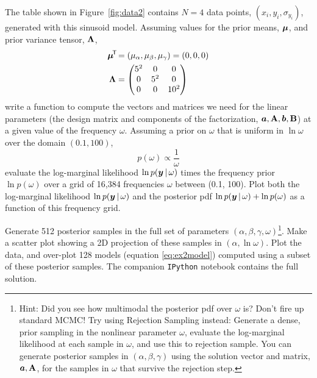 The table shown in Figure~\ref{fig:data2} contains $N=4$ data points, $(x_i,
y_i, \sigma_{y_i})$, generated with this sinusoid model.
Assuming values for the prior means, $\boldsymbol{\mu}$, and prior variance tensor,
$\mathbf{\Lambda}$,
\begin{align}
  \boldsymbol{\mu}^{\!\mathsf{T}\!} &= (\mu_\alpha, \mu_\beta, \mu_\gamma) = (0, 0, 0)\\
  \mathbf{\Lambda} &=
    \begin{pmatrix}
      5^2 & 0 & 0\\
      0 & 5^2 & 0\\
      0 & 0 & 10^2
    \end{pmatrix}
\end{align}
write a function to compute the vectors and matrices we need for the linear
parameters (the design matrix and components of the factorization, $\boldsymbol{a}, \mathbf{A},
\boldsymbol{b}, \mathbf{B}$) at a given value of the frequency $\omega$.
Assuming a prior on $\omega$ that is uniform in $\ln\omega$ over the domain
$(0.1, 100)$,
\begin{equation}
  p(\omega) \propto \frac{1}{\omega}
\end{equation}
evaluate the log-marginal likelihood $\ln p(\boldsymbol{y}\,|\,\omega)$ times the
frequency prior $\ln p(\omega)$ over a grid of 16,384 frequencies $\omega$
between (0.1, 100).
Plot both the log-marginal likelihood $\ln p(\boldsymbol{y}\,|\,\omega)$ and the posterior
pdf $\ln p(\boldsymbol{y}\,|\,\omega) + \ln p(\omega)$ as a function of this frequency
grid.

Generate 512 posterior samples in the full set of parameters $(\alpha, \beta,
\gamma, \omega)$\footnote{Hint: Did you see how multimodal the posterior pdf
over $\omega$ is? Don't fire up standard MCMC! Try using Rejection Sampling
instead: Generate a dense, prior sampling in the nonlinear parameter $\omega$,
evaluate the log-marginal likelihood at each sample in $\omega$, and use this to
rejection sample. You can generate posterior samples in $(\alpha, \beta,
\gamma)$ using the solution vector and matrix, $\boldsymbol{a}, \mathbf{A}$, for the samples in
$\omega$ that survive the rejection step.}.
Make a scatter plot showing a 2D projection of these samples in $(\alpha, \ln
\omega)$.
Plot the data, and over-plot 128 models (equation \ref{eq:ex2model}) computed
using a subset of these posterior samples.
The companion \texttt{IPython} notebook contains the full solution.


